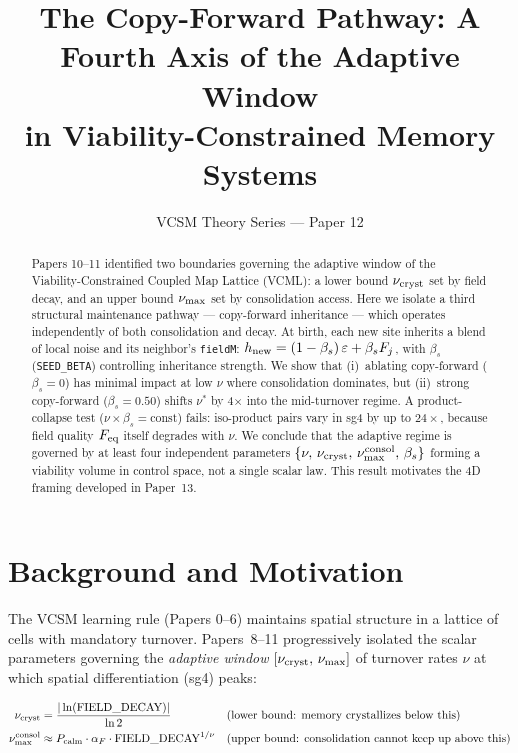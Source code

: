 \documentclass[11pt]{article}
\title{The Copy-Forward Pathway: A Fourth Axis of the Adaptive Window\\
       in Viability-Constrained Memory Systems}
\author{VCSM Theory Series --- Paper 12}
\date{}
\begin{document}
\maketitle

\begin{abstract}
Papers 10--11 identified two boundaries governing the adaptive window of the
Viability-Constrained Coupled Map Lattice (VCML): a lower bound $\nu_{\rm cryst}$
set by field decay, and an upper bound $\nu_{\rm max}$ set by consolidation
access. Here we isolate a third structural maintenance pathway --- copy-forward
inheritance --- which operates independently of both consolidation and decay.
At birth, each new site inherits a blend of local noise and its neighbor's
\texttt{fieldM}: $h_{\rm new} = (1-\beta_s)\,\varepsilon + \beta_s F_j$, with
$\beta_s$ (\texttt{SEED\_BETA}) controlling inheritance strength. We show that
(i)~ablating copy-forward ($\beta_s=0$) has minimal impact at low $\nu$ where
consolidation dominates, but (ii)~strong copy-forward ($\beta_s=0.50$) shifts
$\nu^*$ by 4$\times$ into the mid-turnover regime. A product-collapse test
($\nu \times \beta_s = \text{const}$) fails: iso-product pairs vary in sg4 by
up to $24\times$, because field quality $F_{\rm eq}$ itself degrades with $\nu$.
We conclude that the adaptive regime is governed by at least four
independent parameters $\{\nu,\,\nu_{\rm cryst},\,\nu_{\rm max}^{\rm consol},\,
\beta_s\}$ forming a viability volume in control space, not a single scalar law.
This result motivates the 4D framing developed in Paper~13.
\end{abstract}

\section{Background and Motivation}

The VCSM learning rule (Papers 0--6) maintains spatial structure in a lattice
of cells with mandatory turnover. Papers~8--11 progressively isolated the
scalar parameters governing the \emph{adaptive window} $[\nu_{\rm cryst},\,
\nu_{\rm max}]$ of turnover rates $\nu$ at which spatial differentiation
(sg4) peaks:

\begin{align}
\nu_{\rm cryst} &= \frac{|\ln(\text{FIELD\_DECAY})|}{\ln 2}
   &&\text{(lower bound: memory crystallizes below this)} \label{eq:nu_cryst}\\
\nu_{\rm max}^{\rm consol} &\approx P_{\rm calm} \cdot \alpha_F \cdot
   \text{FIELD\_DECAY}^{1/\nu}
   &&\text{(upper bound: consolidation cannot keep up above this)} \label{eq:nu_max}
\end{align}
\end{document}
